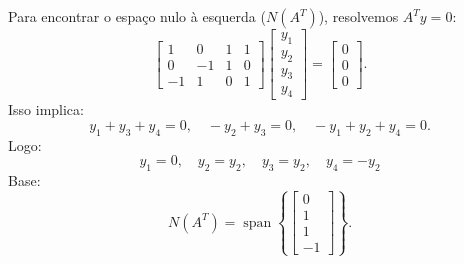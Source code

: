 \begin{resolution}
\begin{enumerate}[label=\alph*)]
          Para encontrar o espaço nulo à esquerda (\( N(A^T) \)), resolvemos \( A^T y = 0 \):
          \[
            \begin{bmatrix}
              1  & 0  & 1 & 1 \\
              0  & -1 & 1 & 0 \\
              -1 & 1  & 0 & 1
            \end{bmatrix}
            \begin{bmatrix}
              y_1 \\ y_2 \\ y_3 \\ y_4
            \end{bmatrix} =
            \begin{bmatrix}
              0 \\ 0 \\ 0
            \end{bmatrix}.
          \]
          Isso implica:
          \[
            y_1 + y_3 + y_4 = 0, \quad -y_2 + y_3 = 0, \quad -y_1 + y_2 + y_4 = 0.
          \]
          Logo:
          \[
            y_1 = 0, \quad y_2 =  y_2, \quad y_3 = y_2, \quad y_4 = -y_2
          \]
          Base:
          \[
            N(A^T) = \operatorname{span}\left\{
            \begin{bmatrix} 0 \\ 1 \\ 1 \\ -1 \end{bmatrix}
            \right\}.
          \]
  \end{enumerate}
\end{resolution}

